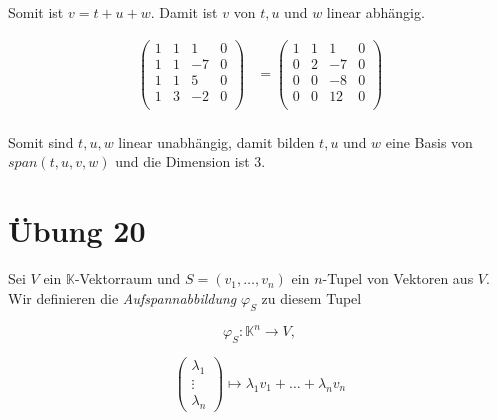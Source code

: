 \documentclass{article}
\begin{document}
\begin{enumerate}[i]
  Somit ist $v = t + u + w$. Damit ist $v$ von $t, u$ und $w$ linear abhängig.
  
  \begin{align*}
    \left(
    \begin{array}{ccc|c}
      1 & 1 & 1  & 0 \\
      1 & 1 & -7 & 0 \\
      1 & 1 & 5  & 0 \\
      1 & 3 & -2 & 0 \\
    \end{array}
    \right)
    &=
    \left(
    \begin{array}{ccc|c}
      1 & 1 & 1  & 0 \\
      0 & 2 & -7 & 0 \\
      0 & 0 & -8 & 0 \\
      0 & 0 & 12 & 0 \\
    \end{array}
    \right) \\
  \end{align*}
  
  Somit sind $t, u, w$ linear unabhängig,
  damit bilden $t, u$ und $w$ eine Basis von $span(t,u,v,w)$ und die Dimension ist 3.
\end{enumerate}

\section*{Übung 20}

Sei $V$ ein $\mathbb{K}$-Vektorraum und $S = \left(v_1, \ldots, v_n  \right)$ ein $n$-Tupel von Vektoren aus $V$.
Wir definieren die \emph{Aufspannabbildung} $\varphi_S$ zu diesem Tupel

\[
  \varphi_S \colon \mathbb{K}^n \to V,
\]

\[
  \begin{pmatrix} \lambda_1 \\ \vdots \\ \lambda_n \end{pmatrix} \mapsto \lambda_1 v_1 + \ldots + \lambda_n v_n
\]
\end{document}
